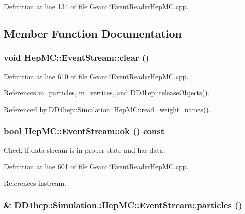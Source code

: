 Definition at line 134 of file Geant4EventReaderHepMC.cpp.

\subsection{Member Function Documentation}
\hypertarget{class_d_d4hep_1_1_simulation_1_1_hep_m_c_1_1_event_stream_a154b4f2355eac25743ec73982d588c39}{
\subsubsection[{clear}]{\setlength{\rightskip}{0pt plus 5cm}void HepMC::EventStream::clear ()}}
\label{class_d_d4hep_1_1_simulation_1_1_hep_m_c_1_1_event_stream_a154b4f2355eac25743ec73982d588c39}


Definition at line 610 of file Geant4EventReaderHepMC.cpp.

References m\_\-particles, m\_\-vertices, and DD4hep::releaseObjects().

Referenced by DD4hep::Simulation::HepMC::read\_\-weight\_\-names().\hypertarget{class_d_d4hep_1_1_simulation_1_1_hep_m_c_1_1_event_stream_a42014bf4f8f95b2c8b54ec5eede2be61}{
\subsubsection[{ok}]{\setlength{\rightskip}{0pt plus 5cm}bool HepMC::EventStream::ok () const}}
\label{class_d_d4hep_1_1_simulation_1_1_hep_m_c_1_1_event_stream_a42014bf4f8f95b2c8b54ec5eede2be61}


Check if data stream is in proper state and has data. 

Definition at line 601 of file Geant4EventReaderHepMC.cpp.

References instream.\hypertarget{class_d_d4hep_1_1_simulation_1_1_hep_m_c_1_1_event_stream_a5a35867853fd21f0c0cf2754bd568671}{
\subsubsection[{particles}]{\& DD4hep::Simulation::HepMC::EventStream::particles ()}}
\label{class_d_d4hep_1_1_simulation_1_1_hep_m_c_1_1_event_stream_a5a35867853fd21f0c0cf2754bd568671}



